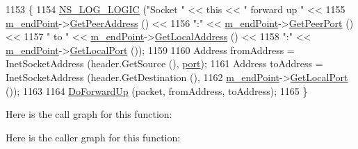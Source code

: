 \begin{DoxyCode}
1153 \{
1154   \hyperlink{group__logging_ga88acd260151caf2db9c0fc84997f45ce}{NS\_LOG\_LOGIC} (\textcolor{stringliteral}{"Socket "} << \textcolor{keyword}{this} << \textcolor{stringliteral}{" forward up "} <<
1155                 \hyperlink{classns3_1_1TcpSocketBase_a78a4181c0a7394749110ea6b194de467}{m\_endPoint}->\hyperlink{classns3_1_1Ipv4EndPoint_a3faf5ec4dce2e951a6ade79758e2075d}{GetPeerAddress} () <<
1156                 \textcolor{stringliteral}{":"} << \hyperlink{classns3_1_1TcpSocketBase_a78a4181c0a7394749110ea6b194de467}{m\_endPoint}->\hyperlink{classns3_1_1Ipv4EndPoint_a0954ccf4be313b3a2992894ae2baf1c6}{GetPeerPort} () <<
1157                 \textcolor{stringliteral}{" to "} << \hyperlink{classns3_1_1TcpSocketBase_a78a4181c0a7394749110ea6b194de467}{m\_endPoint}->\hyperlink{classns3_1_1Ipv4EndPoint_ae08283e26ace5880c3172ea5d803b6f8}{GetLocalAddress} () <<
1158                 \textcolor{stringliteral}{":"} << \hyperlink{classns3_1_1TcpSocketBase_a78a4181c0a7394749110ea6b194de467}{m\_endPoint}->\hyperlink{classns3_1_1Ipv4EndPoint_aab137f64770abf94f0b8a81217a0b106}{GetLocalPort} ());
1159 
1160   Address fromAddress = InetSocketAddress (header.GetSource (), \hyperlink{dsdv-manet_8cc_a8e0798404bf2cf5dabb84c5ba9a4f236}{port});
1161   Address toAddress = InetSocketAddress (header.GetDestination (),
1162                                          \hyperlink{classns3_1_1TcpSocketBase_a78a4181c0a7394749110ea6b194de467}{m\_endPoint}->\hyperlink{classns3_1_1Ipv4EndPoint_aab137f64770abf94f0b8a81217a0b106}{GetLocalPort} ());
1163 
1164   \hyperlink{classns3_1_1TcpSocketBase_ad5e7b21b9e9371bf9c19da5d3c56aac1}{DoForwardUp} (packet, fromAddress, toAddress);
1165 \}
\end{DoxyCode}


Here is the call graph for this function\+:




Here is the caller graph for this function\+:


